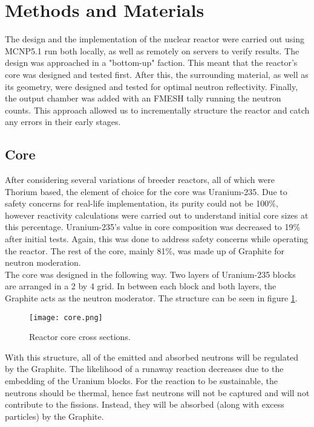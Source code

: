\label{sec:methods}
\section{Methods and Materials}

The design and the implementation of the nuclear reactor were carried out using MCNP5.1 run both locally, as well as remotely on servers to verify results.  The design was approached in a "bottom-up" faction. This meant that the reactor's core was designed and tested first. After this, the surrounding material, as well as its geometry, were designed and tested for optimal neutron reflectivity. Finally, the output chamber was added with an FMESH tally running the neutron counts. This approach allowed us to incrementally structure the reactor and catch any errors in their early stages.\\

\subsection{Core}

After considering several variations of breeder reactors, all of which were Thorium based, the element of choice for the core was Uranium-235. Due to safety concerns for real-life implementation, its purity could not be 100\%, however reactivity calculations were carried out to understand initial core sizes at this percentage. Uranium-235's value in core composition was decreased to 19\% after initial tests. Again, this was done to address safety concerns while operating the reactor. The rest of the core, mainly 81\%, was made up of Graphite for neutron moderation.\\

The core was designed in the following way. Two layers of Uranium-235 blocks are arranged in a 2 by 4 grid. In between each block and both layers, the Graphite acts as the neutron moderator. The structure can be seen in figure \ref{fig:core}.

\begin{figure}[!htbp]
\caption{Reactor core cross sections.}
\label{fig:core}
\centering
\texttt{[image: core.png]}
\end{figure}

With this structure, all of the emitted and absorbed neutrons will be regulated by the Graphite. The likelihood of a runaway reaction decreases due to the embedding of the Uranium blocks. For the reaction to be sustainable, the neutrons should be thermal, hence fast neutrons will not be captured and will not contribute to the fissions. Instead, they will be absorbed (along with excess particles) by the Graphite.\\

